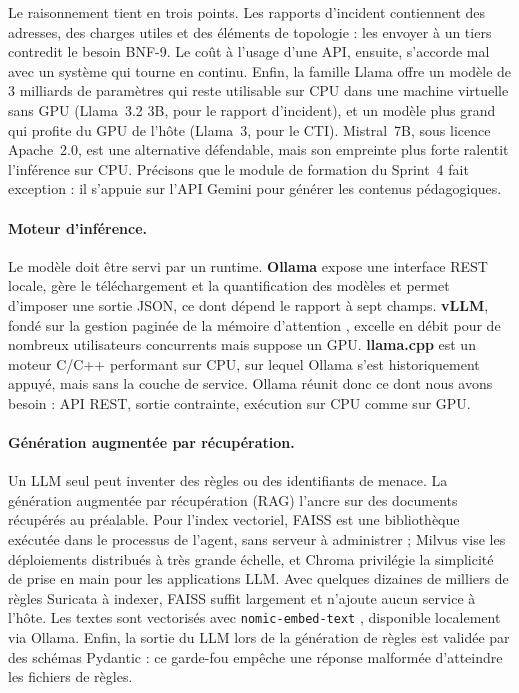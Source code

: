 Le raisonnement tient en trois points. Les rapports d'incident contiennent des adresses, des charges utiles et des éléments de topologie : les envoyer à un tiers contredit le besoin BNF-9. Le coût à l'usage d'une API, ensuite, s'accorde mal avec un système qui tourne en continu. Enfin, la famille Llama offre un modèle de 3 milliards de paramètres qui reste utilisable sur CPU dans une machine virtuelle sans GPU (Llama~3.2 3B, pour le rapport d'incident), et un modèle plus grand qui profite du GPU de l'hôte (Llama~3, pour le CTI). Mistral~7B, sous licence Apache~2.0, est une alternative défendable, mais son empreinte plus forte ralentit l'inférence sur CPU. Précisons que le module de formation du Sprint~4 fait exception : il s'appuie sur l'API Gemini pour générer les contenus pédagogiques.

\paragraph{Moteur d'inférence.}
Le modèle doit être servi par un runtime. \textbf{Ollama} \cite{ollama_docs} expose une interface REST locale, gère le téléchargement et la quantification des modèles et permet d'imposer une sortie JSON, ce dont dépend le rapport à sept champs. \textbf{vLLM}, fondé sur la gestion paginée de la mémoire d'attention \cite{kwon2023vllm}, excelle en débit pour de nombreux utilisateurs concurrents mais suppose un GPU. \textbf{llama.cpp} \cite{llamacpp} est un moteur C/C++ performant sur CPU, sur lequel Ollama s'est historiquement appuyé, mais sans la couche de service. Ollama réunit donc ce dont nous avons besoin : API REST, sortie contrainte, exécution sur CPU comme sur GPU.

\paragraph{Génération augmentée par récupération.}
Un LLM seul peut inventer des règles ou des identifiants de menace. La génération augmentée par récupération (RAG) \cite{lewis2020rag} l'ancre sur des documents récupérés au préalable. Pour l'index vectoriel, FAISS \cite{johnson2021faiss} est une bibliothèque exécutée dans le processus de l'agent, sans serveur à administrer ; Milvus \cite{wang2021milvus} vise les déploiements distribués à très grande échelle, et Chroma \cite{chroma_docs} privilégie la simplicité de prise en main pour les applications LLM. Avec quelques dizaines de milliers de règles Suricata à indexer, FAISS suffit largement et n'ajoute aucun service à l'hôte. Les textes sont vectorisés avec \texttt{nomic-embed-text} \cite{nussbaum2024nomic}, disponible localement via Ollama. Enfin, la sortie du LLM lors de la génération de règles est validée par des schémas Pydantic \cite{pydantic_docs} : ce garde-fou empêche une réponse malformée d'atteindre les fichiers de règles.

